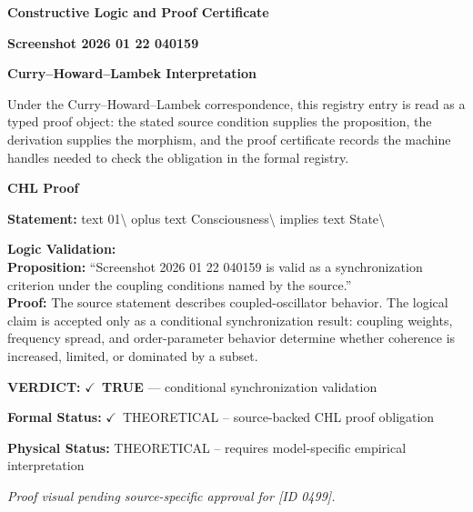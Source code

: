 \clearpage
\begingroup\tzpsupportsetup
\noindent\textbf{\fontsize{10.8pt}{12.8pt}\selectfont [ID 0499] Constructive Logic and Proof Certificate}\par
\noindent\textbf{\fontsize{10pt}{12pt}\selectfont Screenshot 2026 01 22 040159}\par
\vspace{0.45em}
\begingroup
\footnotesize
\setlength{\parskip}{0.22em}
\setlength{\parindent}{0pt}
\noindent\textbf{Curry--Howard--Lambek Interpretation}\par
Under the Curry--Howard--Lambek correspondence, this registry entry is read as a typed proof
object: the stated source condition supplies the proposition, the derivation supplies the
morphism, and the proof certificate records the machine handles needed to check the obligation
in the formal registry.

\vspace{0.45em}
\noindent\textbf{CHL Proof}\par
\textbf{Statement:} text 01\textbackslash{} oplus text Consciousness\textbackslash{} implies text State\textbackslash{}

\textbf{Logic Validation:}\\
\textbf{Proposition:} ``Screenshot 2026 01 22 040159 is valid as a synchronization criterion under the coupling
conditions named by the source.''\\
\textbf{Proof:} The source statement describes coupled-oscillator behavior. The logical claim is
accepted only as a conditional synchronization result: coupling weights, frequency
spread, and order-parameter behavior determine whether coherence is increased, limited,
or dominated by a subset.

\textbf{VERDICT:} \ensuremath{\checkmark}\ \textbf{TRUE} --- conditional synchronization validation

\textbf{Formal Status:} \ensuremath{\checkmark}\ THEORETICAL -- source-backed CHL proof obligation

\textbf{Physical Status:} THEORETICAL -- requires model-specific empirical interpretation
\par\vspace{0.45em}
\par
\vfill
\begingroup\footnotesize\itshape
Proof visual pending source-specific approval for [ID 0499].
\par\endgroup
\vfill
\endgroup
\endgroup
